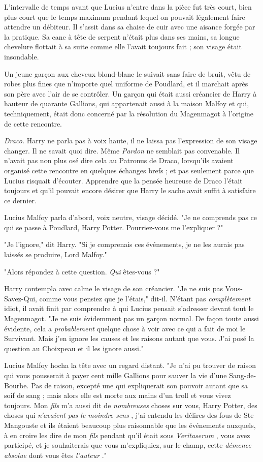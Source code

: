 L'intervalle de temps avant que Lucius n'entre dans la pièce fut très court, bien plus court que le temps maximum pendant lequel on pouvait légalement faire attendre un débiteur. Il s'assit dans sa chaise de cuir avec une aisance forgée par la pratique. Sa cane à tête de serpent n'était plus dans ses mains, sa longue chevelure flottait à sa suite comme elle l'avait toujours fait ; son visage était insondable.

Un jeune garçon aux cheveux blond-blanc le suivait sans faire de bruit, vêtu de robes plus fines que n'importe quel uniforme de Poudlard, et il marchait après son père avec l'air de se contrôler. Un garçon qui était aussi créancier de Harry à hauteur de quarante Gallions, qui appartenait aussi à la maison Malfoy et qui, techniquement, était donc concerné par la résolution du Magenmagot à l'origine de cette rencontre.

\emph{Draco.}  Harry ne parla pas à voix haute, il ne laissa pas l'expression de son visage changer. Il ne savait quoi dire. Même \emph{Pardon}  ne semblait pas convenable. Il n'avait pas non plus osé dire cela au Patronus de Draco, lorsqu'ils avaient organisé cette rencontre en quelques échanges brefs ; et pas seulement parce que Lucius risquait d'écouter. Apprendre que la pensée heureuse de Draco l'était toujours et qu'il pouvait encore désirer que Harry le sache avait suffit à satisfaire ce dernier.

Lucius Malfoy parla d'abord, voix neutre, visage décidé. "Je ne comprends pas ce qui se passe à Poudlard, Harry Potter. Pourriez-vous me l'expliquer ?"

"Je l'ignore," dit Harry. "Si je comprenais ces événements, je ne les aurais pas laissés se produire, Lord Malfoy."

"Alors répondez à cette question. \emph{Qui}  êtes-vous ?"

Harry contempla avec calme le visage de son créancier. "Je ne suis pas Vous-Savez-Qui, comme vous pensiez que je l'étais," dit-il. N'étant pas \emph{complètement}  idiot, il avait finit par comprendre à qui Lucius pensait s'adresser devant tout le Magenmagot. "Je ne suis évidemment pas un garçon normal. De façon toute aussi évidente, cela a \emph{probablement}  quelque chose à voir avec ce qui a fait de moi le Survivant. Mais j'en ignore les causes et les raisons autant que vous. J'ai posé la question au Choixpeau et il les ignore aussi."

Lucius Malfoy hocha la tête avec un regard distant. "Je n'ai pu trouver de raison qui vous pousserait à payer cent mille Gallions pour sauver la vie d'une Sang-de-Bourbe. Pas de raison, excepté une qui expliquerait son pouvoir autant que sa soif de sang ; mais alors elle est morte aux mains d'un troll et vous vivez toujours. Mon \emph{fils}  m'a aussi dit de \emph{nombreuses}  choses sur vous, Harry Potter, des choses qui \emph{n'avaient pas le moindre sens} , j'ai entendu les délires des fous de Ste Mangouste et ils étaient beaucoup plus raisonnable que les événements auxquels, à en croire les dire de mon \emph{fils}  pendant qu'il était sous \emph{Veritaserum} , vous avez participé, et je souhaiterais que vous m'expliquiez, sur-le-champ, cette \emph{démence absolue}  dont vous êtes \emph{l'auteur} ."

